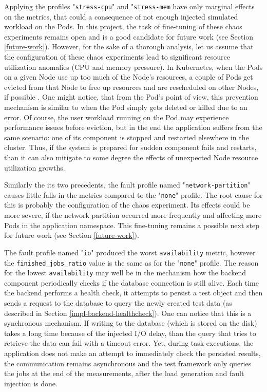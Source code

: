 Applying the profiles "\texttt{stress-cpu}" and "\texttt{stress-mem} have only marginal effects on the metrics, that could a consequence of not enough injected simulated workload on the Pods. In this project, the task of fine-tuning of these chaos experiments remains open and is a good candidate for future work (see Section \ref{future-work}). However, for the sake of a thorough analysis, let us assume that the configuration of these chaos experiments lead to significant resource utilization anomalies (CPU and memory pressure). In Kubernetes, when the Pods on a given Node use up too much of the Node's resources, a couple of Pods get evicted from that Node to free up resources and are rescheduled on other Nodes, if possible \cite{KubernetesNodePressureEviction}. One might notice, that from the Pod's point of view, this prevention mechanism is similar to when the Pod simply gets deleted or killed due to an error. Of course, the user workload running on the Pod may experience performance issues before eviction, but in the end the application suffers from the same scenario: one of its component is stopped and restarted elsewhere in the cluster. Thus, if the system is prepared for sudden component fails and restarts, than it can also mitigate to some degree the effects of unexpected Node resource utilization growths.

Similarly the its two precedents, the fault profile named "\texttt{network-partition}" causes little falls in the metrics compared to the "\texttt{none}" profile. The root cause for this is probably the configuration of the chaos experiment. Its effects could be more severe, if the network partition occurred more frequently and affecting more Pods in the application namespace. This fine-tuning remains a possible next step for future work (see Section \ref{future-work}).

The fault profile named "\texttt{io}" produced the worst \texttt{availability} metric, however the \texttt{finished\_jobs\_ratio} value is the same as for the "\texttt{none}" profile. The reason for the lowest \texttt{availability} may well be in the mechanism how the backend component periodically checks if the database connection is still alive. Each time the backend performs a health check, it attempts to persist a test object and then sends a request to the database to query the newly created test data (as described in Section \ref{impl-backend-healthcheck}). One can notice that this is a synchronous mechanism. If writing to the database (which is stored on the disk) takes a long time because of the injected I/O delay, than the query that tries to retrieve the data can fail with a timeout error. Yet, during task executions, the application does not make an attempt to immediately check the persisted results, the communication remains asynchronous and the test framework only queries the jobs at the end of the measurements, after the load generation and fault injection is done.


